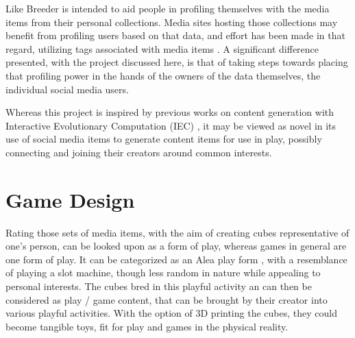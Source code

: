 \documentclass[conference]{IEEETran}
\begin{document}

Like Breeder is intended to aid people in profiling themselves with the media items from their personal collections.  Media sites hosting those collections may benefit from profiling users based on that data, and effort has been made in that regard, utilizing tags associated with media items \cite{guy2010social,hung2008tag}.  A significant difference presented, with the project discussed here, is that of taking steps towards placing that profiling power in the hands of the owners of the data themselves, the individual social media users.

Whereas this project is inspired by previous works on content generation with Interactive Evolutionary Computation (IEC) \cite{cardamone2011interactive,togelius2007towards,secretan2011picbreeder}, it may be viewed as novel in its use of social media items to generate content items for use in play, possibly connecting and joining their creators around common interests.



\section{Game Design}
\label{sec:GameDesign}

Rating those sets of media items, with the aim of creating cubes representative of one's person, can be looked upon as a form of play, whereas games in general are one form of play.  It can be categorized as an Alea play form \cite{caillois2001man}, with a resemblance of playing a slot machine, though less random in nature while appealing to personal interests.  The cubes bred in this playful activity an can then be considered as play / game content, that can be brought by their creator into various playful activities.  With the option of 3D printing the cubes, they could become tangible toys, fit for play and games in the physical reality.
\end{document}
